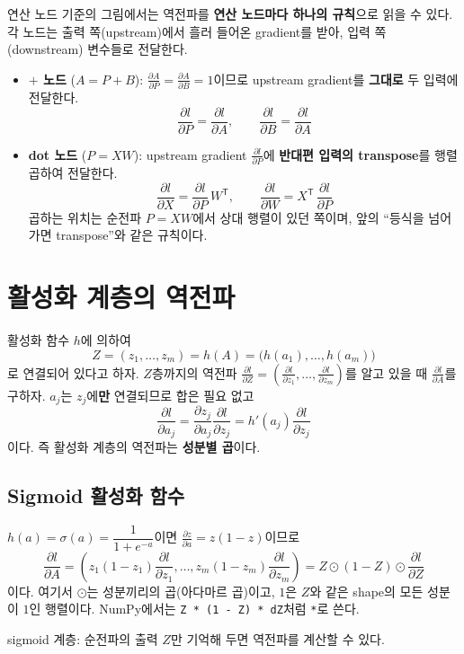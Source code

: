 \documentclass[11pt,a4paper]{article}
\newcommand{\T}{^{\mathsf T}}
\newcommand{\sigmoid}{\sigma}
\newcommand{\pd}[2]{\frac{\partial #1}{\partial #2}}
\begin{document}
연산 노드 기준의 그림에서는 역전파를 \textbf{연산 노드마다 하나의 규칙}으로 읽을 수 있다.
각 노드는 출력 쪽(upstream)에서 흘러 들어온 gradient를 받아, 입력 쪽(downstream) 변수들로 전달한다.
\begin{itemize}[leftmargin=1.8em]
\item \textbf{$+$ 노드} ($A=P+B$):
$\pd{A}{P}=\pd{A}{B}=1$이므로 upstream gradient를 \textbf{그대로} 두 입력에 전달한다.
\[
\pd{l}{P}=\pd{l}{A},\qquad \pd{l}{B}=\pd{l}{A}
\]
\item \textbf{dot 노드} ($P=XW$):
upstream gradient $\pd{l}{P}$에 \textbf{반대편 입력의 transpose}를 행렬곱하여 전달한다.
\[
\pd{l}{X}=\pd{l}{P}\,W\T,
\qquad
\pd{l}{W}=X\T\,\pd{l}{P}
\]
곱하는 위치는 순전파 $P=XW$에서 상대 행렬이 있던 쪽이며,
앞의 ``등식을 넘어가면 transpose''와 같은 규칙이다.
\end{itemize}


\section{활성화 계층의 역전파}

활성화 함수 $h$에 의하여
\[
Z=(z_1,\ldots,z_m)=h(A)=\bigl(h(a_1),\ldots,h(a_m)\bigr)
\]
로 연결되어 있다고 하자.
$Z$층까지의 역전파 $\pd{l}{Z}=\left(\pd{l}{z_1},\ldots,\pd{l}{z_m}\right)$를 알고 있을 때
$\pd{l}{A}$를 구하자.
$a_j$는 $z_j$에\textbf{만} 연결되므로 합은 필요 없고
\[
\pd{l}{a_j}=\pd{z_j}{a_j}\pd{l}{z_j}=h'(a_j)\pd{l}{z_j}
\]
이다. 즉 활성화 계층의 역전파는 \textbf{성분별 곱}이다.

\subsection{Sigmoid 활성화 함수}

$h(a)=\sigmoid(a)=\dfrac{1}{1+e^{-a}}$이면 $\pd{z}{a}=z(1-z)$이므로
\[
\pd{l}{A}
=\left(z_1(1-z_1)\pd{l}{z_1},\ldots,z_m(1-z_m)\pd{l}{z_m}\right)
=\boxed{Z\odot(1-Z)\odot\pd{l}{Z}}
\]
이다. 여기서 $\odot$는 성분끼리의 곱(아다마르 곱)이고, $1$은 $Z$와 같은 shape의 모든 성분이 $1$인 행렬이다.
NumPy에서는 \texttt{Z * (1 - Z) * dZ}처럼 \texttt{*}로 쓴다.

\begin{center}

\small sigmoid 계층: 순전파의 출력 $Z$만 기억해 두면 역전파를 계산할 수 있다.
\end{center}
\end{document}
